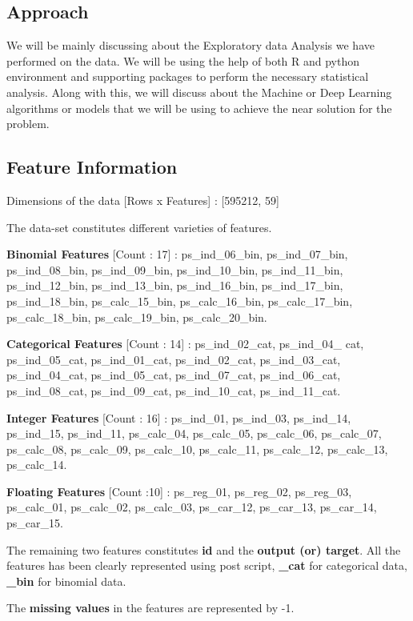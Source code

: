 \subsection{Approach}
We will be mainly discussing about the Exploratory data Analysis we have performed on the data. We will be using the help of both R and python environment and supporting packages to perform the necessary statistical analysis. Along with this, we will discuss about the Machine or Deep Learning algorithms or models that we will be using to achieve the near solution for the problem.

\subsection{Feature Information}

Dimensions of the data [Rows x Features] : [595212, 59]
 
The data-set constitutes different varieties of features.
 
 \textbf{Binomial Features} [Count : 17] :  ps\_ind\_06\_bin,  ps\_ind\_07\_bin, ps\_ind\_08\_bin, ps\_ind\_09\_bin, ps\_ind\_10\_bin, ps\_ind\_11\_bin, ps\_ind\_12\_bin, ps\_ind\_13\_bin, ps\_ind\_16\_bin, ps\_ind\_17\_bin, ps\_ind\_18\_bin, ps\_calc\_15\_bin, ps\_calc\_16\_bin, ps\_calc\_17\_bin, ps\_calc\_18\_bin, ps\_calc\_19\_bin, ps\_calc\_20\_bin.

 \textbf{Categorical Features} [Count : 14] : ps\_ind\_02\_cat,  ps\_ind\_04\_ cat, ps\_ind\_05\_cat, ps\_ind\_01\_cat, ps\_ind\_02\_cat,  ps\_ind\_03\_cat, ps\_ind\_04\_cat, ps\_ind\_05\_cat, ps\_ind\_07\_cat,  ps\_ind\_06\_cat, ps\_ind\_08\_cat, ps\_ind\_09\_cat, ps\_ind\_10\_cat,  ps\_ind\_11\_cat.

 \textbf{Integer Features} [Count : 16] : ps\_ind\_01, ps\_ind\_03, ps\_ind\_14, ps\_ind\_15, ps\_ind\_11, ps\_calc\_04, ps\_calc\_05, ps\_calc\_06, ps\_calc\_07, ps\_calc\_08, ps\_calc\_09, ps\_calc\_10, ps\_calc\_11, ps\_calc\_12, ps\_calc\_13, ps\_calc\_14.

 \textbf{Floating Features} [Count :10] : ps\_reg\_01, ps\_reg\_02, ps\_reg\_03, ps\_calc\_01, ps\_calc\_02, ps\_calc\_03, ps\_car\_12, ps\_car\_13, ps\_car\_14, ps\_car\_15.
 
The remaining two features constitutes \textbf{id} and the \textbf{output (or) target}. 
All the features has been clearly represented using post script, \textbf{\_cat} for categorical data, \textbf{\_bin} for binomial data.
 
The \textbf{missing values} in the features are represented by -1.

